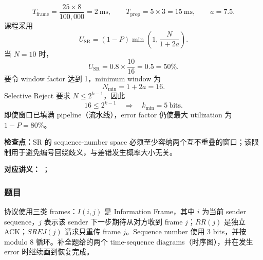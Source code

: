 \begin{checkedsolution}
\[
  T_{\mathrm{frame}}=\frac{25\times8}{100{,}000}=2\ \mathrm{ms},
  \qquad
  T_{\mathrm{prop}}=5\times3=15\ \mathrm{ms},
  \qquad a=7.5.
\]
课程采用
\[
  U_{\mathrm{SR}}
  =(1-P)\min\!\left(1,\frac{N}{1+2a}\right).
\]
当 $N=10$ 时，
\[
  U_{\mathrm{SR}}
  =0.8\times\frac{10}{16}
  =\boxed{0.5=50\%}.
\]
要令 window factor 达到 1，minimum window 为
\[
  \boxed{N_{\min}=1+2a=16}.
\]
Selective Reject 要求 $N\le2^{k-1}$，因此
\[
  16\le2^{k-1}
  \quad\Longrightarrow\quad
  \boxed{k_{\min}=5\ \mathrm{bits}}.
\]
即使窗口已填满 pipeline（流水线），error factor 仍使最大 utilization 为 $1-P=80\%$。
\end{checkedsolution}

\textbf{检查点：}SR 的 sequence-number space 必须至少容纳两个互不重叠的窗口；该限制用于避免编号回绕歧义，与差错发生概率大小无关。


\textbf{对应讲义：}
；

\subsubsection*{题目}

协议使用三类 frames：$I(i,j)$ 是 Information Frame，其中 $i$ 为当前 sender sequence，$j$ 表示该 sender 下一步期待从对方收到 frame $j$；$RR(j)$ 是独立 ACK；$SREJ(j)$ 请求只重传 frame $j$。Sequence number 使用 3 bits，并按 modulo $8$ 循环。补全题给的两个 time-sequence diagrams（时序图），并在发生 error 时继续画到恢复完成。

